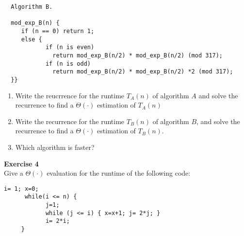 \documentclass[11pt]{article}
\begin{document}
  \begin{verbatim}
  Algorithm B.
  
  mod_exp_B(n) {
     if (n == 0) return 1;
     else {
            if (n is even) 
              return mod_exp_B(n/2) * mod_exp_B(n/2) (mod 317);
            if (n is odd) 
              return mod_exp_B(n/2) * mod_exp_B(n/2) *2 (mod 317);
  }}
  \end{verbatim}
  \begin{enumerate}
    \item Write the reucrrence for the runtime \(T_{A}(n)\) of algorithm $A$ and solve the recurrence to find a \(\Theta(\cdot)\) estimation of \(T_{A}(n)\)
    \item Write the recurrence for the runtime \(T_B(n)\) of algorithm $B$, and solve the recurrence to find a \(\Theta(\cdot)\) estimation of \(T_B(n)\).
    \item Which algorithm is faster?
  \end{enumerate}
  \newpage
  \noindent
  \textbf{Exercise 4} \vspace{2mm} \\
  Give a \(\Theta(\cdot)\) evaluation for the runtime of the following code:
  \begin{center}
    \begin{lstlisting}[numbers=none, keywordstyle=\bfseries, frame=none, title={Assume that $n$ is a power two. Then $i$ from the outer loop takes successively the values: \(1, \: 2, \: 2^2, \: 2^3, \: \ldots, 2^{\log{n}}\)}]
      i= 1; x=0;
      while(i <= n) {
            j=1;
            while (j <= i) { x=x+1; j= 2*j; }
            i= 2*i;
     }       
    \end{lstlisting}  
  \end{center}
\end{document}
